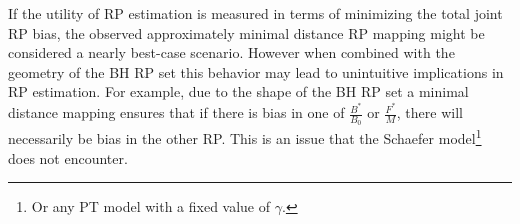 %
If the utility of RP estimation is measured in terms of minimizing the total 
joint RP bias, the observed approximately minimal distance RP mapping might be considered 
a nearly best-case scenario. %
However when combined with the geometry of the BH RP set this behavior may 
lead to unintuitive implications in RP estimation.
For example, due to the shape of the BH RP set a minimal distance mapping
ensures that if there is bias in one of $\frac{B^*}{B_0}$ or $\frac{F^*}{M}$, 
there will necessarily be bias in the other RP. This is an issue that the 
Schaefer model\footnote{Or any PT model with a fixed value of $\gamma$.} 
does not encounter.  


